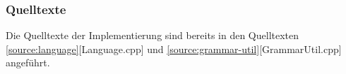 \documentclass[11pt, a4paper, twoside]{article}   	%
\newenvironment{code}{\captionsetup{type=listing}}{}
\begin{document}
\subsubsection{Quelltexte}
Die Quelltexte der Implementierung sind bereits in den Quelltexten \ref{source:language}[Language.cpp] und \ref{source:grammar-util}[GrammarUtil.cpp] angeführt.

\end{document}
